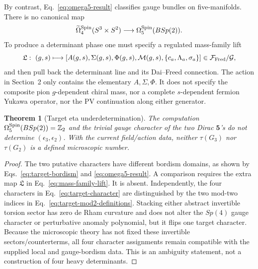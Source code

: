 \documentclass[11pt]{article}
\newtheorem{theorem}{Theorem}[section]
\theoremstyle{definition}
\theoremstyle{remark}
\newcommand{\ZZ}{\mathbb Z}
\begin{document}
By contrast, Eq.~\eqref{eq:omega5-result} classifies gauge bundles on
five-manifolds.  There is no canonical map
\begin{equation}
 \widetilde\Omega_4^{\rm Spin}(S^3\times S^2)
 \longrightarrow\Omega_5^{\rm Spin}(BSp(2)).
 \label{eq:no-canonical-map}
\end{equation}
To produce a determinant phase one must specify a regulated mass-family
lift
\begin{equation}
 \mathfrak L:\ (g,s)\longmapsto
 [A(g,s),\Sigma(g,s),\Phi(g,s),\mathcal M(g,s),\{c_a,\Lambda_a,\sigma_a\}]
 \in\mathcal F_{\rm Fred}/\mathcal G,
 \label{eq:mass-family-lift}
\end{equation}
and then pull back the determinant line and its Dai--Freed connection.
The action in Section~2 only contains the elementary
\(A,\Sigma,\Phi\).  It does not specify the composite pion
\(g\)-dependent chiral mass, nor a complete \(s\)-dependent fermion
Yukawa operator, nor the PV continuation along either generator.

\begin{theorem}[Target eta underdetermination]
The computation
\(\Omega_5^{\rm Spin}(BSp(2))=\ZZ_2\) and the trivial gauge character of
the two Dirac \(\bm5\)'s do not determine
\((\epsilon_3,\epsilon_2)\).  With the current field/action data, neither
\(\tau(G_3)\) nor \(\tau(G_2)\) is a defined microscopic number.
\end{theorem}
\begin{proof}
The two putative characters have different bordism domains, as shown by
Eqs.~\eqref{eq:target-bordism} and \eqref{eq:omega5-result}.  A comparison
requires the extra map \(\mathfrak L\) in
Eq.~\eqref{eq:mass-family-lift}.  It is absent.  Independently, the four
characters in Eq.~\eqref{eq:target-character} are distinguished by the two
mod-two indices in Eq.~\eqref{eq:target-mod2-definitions}.  Stacking either
abstract invertible torsion sector has zero de Rham curvature and does not
alter the \(Sp(4)\) gauge character or perturbative anomaly polynomial, but
it flips one target character.  Because the microscopic theory has not
fixed these invertible sectors/counterterms, all four character assignments
remain compatible with the supplied local and gauge-bordism data.  This is
an ambiguity statement, not a construction of four heavy determinants.
\end{proof}
\end{document}
